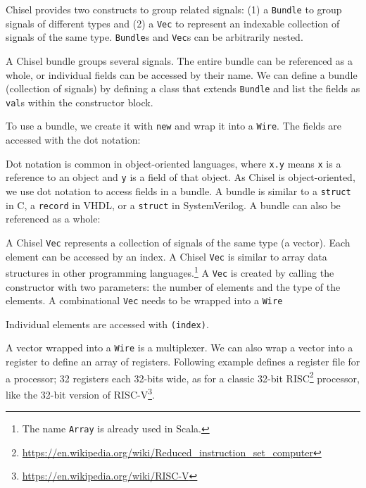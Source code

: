 \documentclass[%
    10pt,
    headinclude, footexclude,
    openright, %
    notitlepage,
    cleardoubleempty,
    headsepline,
    pointlessnumbers,
    bibtotoc, idxtotoc,
    ]{scrbook}
\newcommand{\code}[1]{{\small{\texttt{#1}}}}
\newcommand{\codefoot}[1]{{\footnotesize{\texttt{#1}}}}
\newcommand{\myref}[2]{\href{#1}{#2}}
\renewcommand{\myref}[2]{{#2}{\footnote{\url{#1}}}}
\begin{document}
Chisel provides two constructs to group related signals: (1) a \code{Bundle} to group
signals of different types and (2) a \code{Vec} to represent an indexable collection of signals
of the same type.
\code{Bundle}s and \code{Vec}s can be arbitrarily nested.

A Chisel bundle groups several signals. The entire bundle can be referenced
as a whole, or individual fields can be accessed by their name.
We can define a bundle (collection of signals) by defining a class that
extends \code{Bundle} and list the fields as \code{val}s within the constructor block.


\noindent To use a bundle, we create it with \code{new} and wrap it into a \code{Wire}.
The fields are accessed with the dot notation:


Dot notation is common in object-oriented languages, where \code{x.y} means
\code{x} is a reference to an object and \code{y} is a field of that object.
As Chisel is object-oriented, we use dot notation to access fields in a bundle.
A bundle is similar to a \code{struct} in C, a \code{record} in VHDL, or a
\code{struct} in SystemVerilog.
A bundle can also be referenced as a whole:


A Chisel \code{Vec} represents a collection of signals of the same type (a vector).
Each element can be accessed by an index. A Chisel \code{Vec} is similar
to array data structures in other programming languages.\footnote{The name \codefoot{Array}
is already used in Scala.}
A \code{Vec} is created by calling the constructor with two parameters: the
number of elements and the type of the elements. A combinational \code{Vec}
needs to be wrapped into a \code{Wire}


\noindent Individual elements are accessed with \code{(index)}.


A vector wrapped into a \code{Wire} is a multiplexer.
We can also wrap a vector into a register to define an array of registers.
Following example defines a register file for a processor; 32 registers
each 32-bits wide, as for a classic 32-bit 
\myref{https://en.wikipedia.org/wiki/Reduced_instruction_set_computer}{RISC}
processor, like the 32-bit version of \myref{https://en.wikipedia.org/wiki/RISC-V}{RISC-V}.
\end{document}
